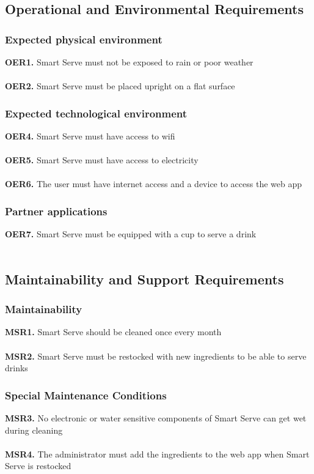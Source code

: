 \documentclass{article}
\begin{document}
\subsection{Operational and Environmental Requirements}
    \subsubsection{Expected physical environment}
        \noindent\textbf{OER1.} Smart Serve must not be exposed to rain or poor weather \\\\
        \textbf{OER2.} Smart Serve must be placed upright on a flat surface \\
    \subsubsection{Expected technological environment}
        \noindent\textbf{OER4.} Smart Serve must have access to wifi \\\\
        \textbf{OER5.} Smart Serve must have access to electricity \\\\
        \textbf{OER6.} The user must have internet access and a device to access the web app \\
    \subsubsection{Partner applications}
        \noindent\textbf{OER7.} Smart Serve must be equipped with a cup to serve a drink \\\\

\subsection{Maintainability and Support Requirements}
    \subsubsection{Maintainability}
        \noindent\textbf{MSR1.} Smart Serve should be cleaned once every month \\\\
        \textbf{MSR2.} Smart Serve must be restocked with new ingredients to be able to serve drinks \\
    \subsubsection{Special Maintenance Conditions} 
        \noindent\textbf{MSR3.} No electronic or water sensitive components of Smart Serve can get wet during cleaning \\\\
        \textbf{MSR4.} The administrator must add the ingredients to the web app when Smart Serve is restocked \\
\end{document}
